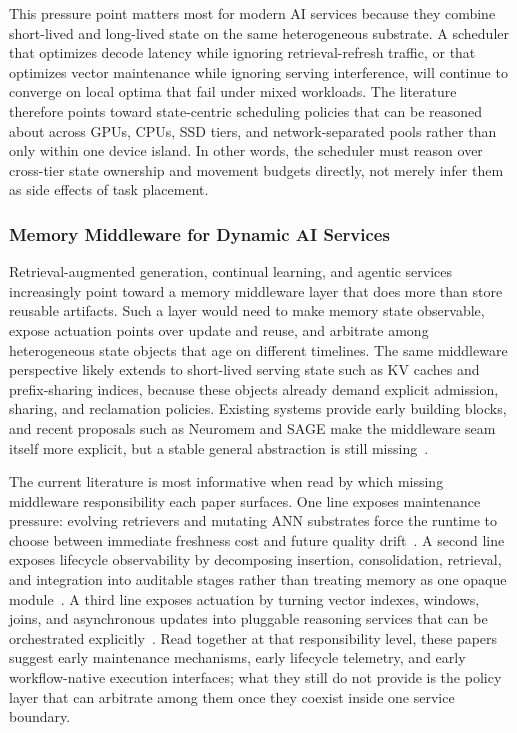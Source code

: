 \documentclass[acmsmall,screen,review]{acmart}
\begin{document}
This pressure point matters most for modern AI services because they combine short-lived and long-lived state on the same heterogeneous substrate. A scheduler that optimizes decode latency while ignoring retrieval-refresh traffic, or that optimizes vector maintenance while ignoring serving interference, will continue to converge on local optima that fail under mixed workloads. The literature therefore points toward state-centric scheduling policies that can be reasoned about across GPUs, CPUs, SSD tiers, and network-separated pools rather than only within one device island. In other words, the scheduler must reason over cross-tier state ownership and movement budgets directly, not merely infer them as side effects of task placement.

\subsubsection{Memory Middleware for Dynamic AI Services}

Retrieval-augmented generation, continual learning, and agentic services increasingly point toward a memory middleware layer that does more than store reusable artifacts. Such a layer would need to make memory state observable, expose actuation points over update and reuse, and arbitrate among heterogeneous state objects that age on different timelines. The same middleware perspective likely extends to short-lived serving state such as KV caches and prefix-sharing indices, because these objects already demand explicit admission, sharing, and reclamation policies. Existing systems provide early building blocks, and recent proposals such as Neuromem and SAGE make the middleware seam itself more explicit, but a stable general abstraction is still missing~\cite{zhang2026neuromem,liu2026sage}.

The current literature is most informative when read by which missing middleware responsibility each paper surfaces. One line exposes maintenance pressure: evolving retrievers and mutating ANN substrates force the runtime to choose between immediate freshness cost and future quality drift~\cite{zhang2026flowrag,wang2026candor}. A second line exposes lifecycle observability by decomposing insertion, consolidation, retrieval, and integration into auditable stages rather than treating memory as one opaque module~\cite{zhang2026neuromem}. A third line exposes actuation by turning vector indexes, windows, joins, and asynchronous updates into pluggable reasoning services that can be orchestrated explicitly~\cite{liu2026sage}. Read together at that responsibility level, these papers suggest early maintenance mechanisms, early lifecycle telemetry, and early workflow-native execution interfaces; what they still do not provide is the policy layer that can arbitrate among them once they coexist inside one service boundary.
\end{document}
